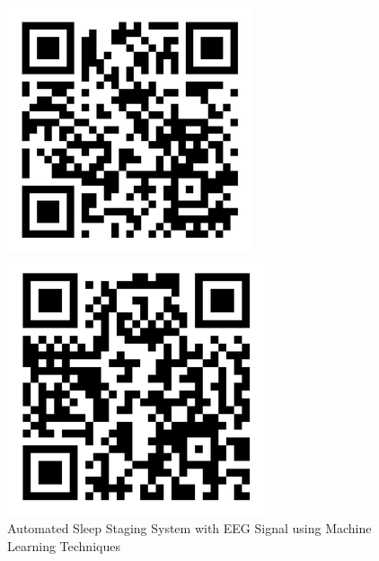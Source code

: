 \begin{figure}[h!]
	\centering
	\begin{minipage}[b]{0.3\linewidth}
		\centering
		\includegraphics[width=\linewidth]{img/paper3}
		\caption{Automated Sleep Staging System with EEG Signal using Machine Learning Techniques}
		\label{fig:paper3}
	\end{minipage}\hfill
	\begin{minipage}[b]{0.3\linewidth}
		\centering
		\includegraphics[width=\linewidth]{img/paper1}

\end{minipage}
\end{figure}
